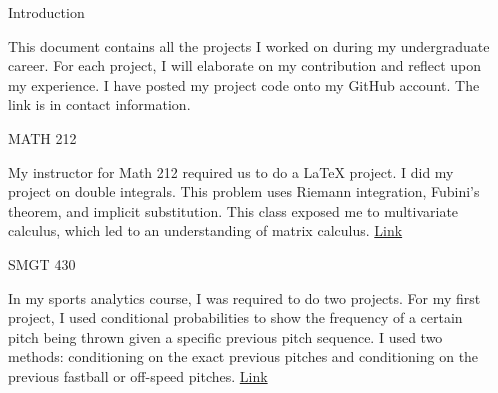 \documentclass[final]{beamer}
\newlength{\sepwid}
\newlength{\onecolwid}
\begin{document}
\begin{frame}[t] %

\begin{columns}[t] %

\begin{column}{\sepwid}\end{column} %

\begin{column}{\onecolwid} %


\begin{alertblock}{Introduction}

This document contains all the projects I worked on during my undergraduate career. 
For each project, I will elaborate on my contribution and reflect upon my 
experience. I have posted my project code onto my GitHub account. The link is in 
contact information.

\end{alertblock}


\begin{block}{MATH 212}

My instructor for Math 212 required us to do a LaTeX 
project. I did my project on double integrals. This 
problem uses Riemann integration, Fubini's theorem, 
and implicit substitution. This class exposed me to multivariate 
calculus, which led to an understanding of matrix calculus. 
\href{https://www.dropbox.com/s/bl541qefgk8hnfn/math-212.pdf?dl=0}
{Link}

\end{block}

\begin{block}{SMGT 430}

In my sports analytics course, I was required to do two projects. For my first project, I used conditional probabilities to show the frequency of a certain pitch being thrown given a specific previous pitch sequence. I used two methods: conditioning on the exact previous pitches and conditioning on the previous fastball or off-speed pitches. \href{https://www.dropbox.com/s/1lt6luvqioqada3/smgt-430-pitch-sequences.pdf?dl=0}
{Link}


\end{block}
\end{column}
\end{columns}
\end{frame}
\end{document}
